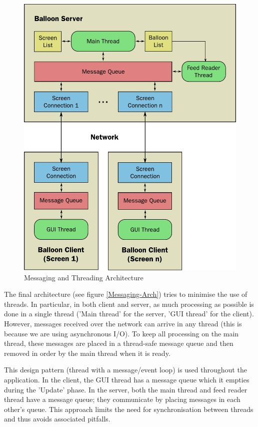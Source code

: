 \begin{figure}
\begin{centering}
\includegraphics[scale=0.95]{Diagrams/messaging}
\par\end{centering}

\caption{Messaging and Threading Architecture}
\label{Messaging-Arch}
\end{figure}

The final architecture (see figure \vref{Messaging-Arch}) tries to minimise the
use of threads. In particular, in both client and server, as much processing as
possible is done in a single thread ('Main thread' for the server, 'GUI thread'
for the client). However, messages received over the network
can arrive in any thread (this is because we are using asynchronous I/O). To 
keep all processing on the main thread, these messages are placed in a thread-safe
message queue and then removed in order by the main thread when it is ready. 

This design pattern (thread with a message/event loop) is used throughout the
application. In the client, the GUI thread has a message queue which it empties
during the 'Update' phase. In the server, both the main thread and feed reader 
thread have a message queue; they communicate by placing messages in each other's
queue. This approach limits the need for synchronisation between threads and 
thus avoids associated pitfalls.

